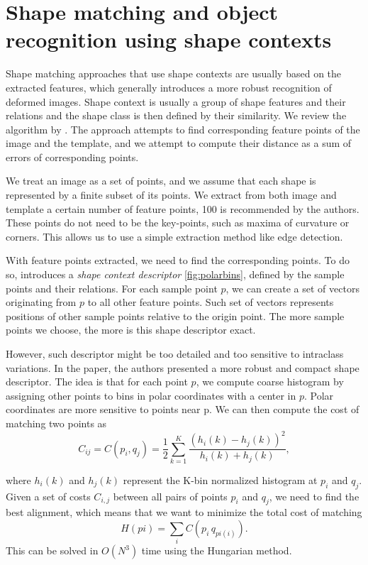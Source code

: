\section{Shape matching and object recognition using shape contexts}
Shape matching approaches that use shape contexts are usually based on the extracted features, which generally introduces a more robust recognition of deformed images. Shape context is usually a group of shape features and their relations and the shape class is then defined by their similarity. We review the algorithm by \citet{simple}. The approach attempts to find corresponding feature points of the image and the template, and we attempt to compute their distance as a sum of errors of corresponding points.

We treat an image as a set of points, and we assume that each shape is represented by a finite subset of its points. We extract from both image and template a certain number of feature points, 100 is recommended by the authors. These points do not need to be the key-points, such as maxima of curvature or corners. This allows us to use a simple extraction method like edge detection.

With feature points extracted, we need to find the corresponding points. To do so, \citet{simple} introduces a \emph{shape context descriptor} \ref{fig:polarbins}, defined by the sample points and their relations. For each sample point $p$, we can create a set of vectors originating from $p$ to all other feature points. Such set of vectors represents positions of other sample points relative to the origin point. The more sample points we choose, the more is this shape descriptor exact.

However, such descriptor might be too detailed and too sensitive to intraclass variations. In the paper, the authors presented a more robust and compact shape descriptor. The idea is that for each point $p$, we compute coarse histogram by assigning other points to bins in polar coordinates with a center in $p$. Polar coordinates are more sensitive to points near p. We can then compute the cost of matching two points as
\[ C_{ij} =  C(p_{i},q_{j}) = \frac{1}{2} \sum_{k=1}^{K} \frac{(h_{i}(k) - h_{j}(k))^2}{h_{i}(k) + h_{j}(k)}, \]

where $ h_{i}(k) $ and $ h_{j}(k) $ represent the K-bin normalized histogram at $p_{i}$ and $q_{j}$. Given a set of costs $C_{i,j}$ between all pairs of points $p_{i}$ and $q_{j}$, we need to find the best alignment, which means that we want to minimize the total cost of matching 
\[ H(pi) = \sum_{i} C(p_{i}\,q_{pi(i)}). \]
This can be solved in $O(N^3)$ time using the Hungarian method\cite{simple}. 

